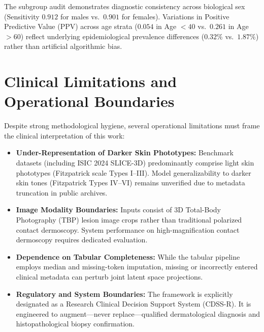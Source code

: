 \documentclass[12pt,a4paper]{report}
\begin{document}
	The subgroup audit demonstrates diagnostic consistency across biological sex (Sensitivity $0.912$ for males vs.\ $0.901$ for females). Variations in Positive Predictive Value (PPV) across age strata ($0.054$ in Age $<40$ vs.\ $0.261$ in Age $>60$) reflect underlying epidemiological prevalence differences ($0.32\%$ vs.\ $1.87\%$) rather than artificial algorithmic bias.
	
	\section{Clinical Limitations and Operational Boundaries}
	Despite strong methodological hygiene, several operational limitations must frame the clinical interpretation of this work:
	\begin{itemize}
		\item \textbf{Under-Representation of Darker Skin Phototypes:} Benchmark datasets (including ISIC 2024 SLICE-3D) predominantly comprise light skin phototypes (Fitzpatrick scale Types I--III). Model generalizability to darker skin tones (Fitzpatrick Types IV--VI) remains unverified due to metadata truncation in public archives.
		\item \textbf{Image Modality Boundaries:} Inputs consist of 3D Total-Body Photography (TBP) lesion image crops rather than traditional polarized contact dermoscopy. System performance on high-magnification contact dermoscopy requires dedicated evaluation.
		\item \textbf{Dependence on Tabular Completeness:} While the tabular pipeline employs median and missing-token imputation, missing or incorrectly entered clinical metadata can perturb joint latent space projections.
		\item \textbf{Regulatory and System Boundaries:} The framework is explicitly designated as a Research Clinical Decision Support System (CDSS-R). It is engineered to augment—never replace—qualified dermatological diagnosis and histopathological biopsy confirmation.
	\end{itemize}
	
\end{document}
